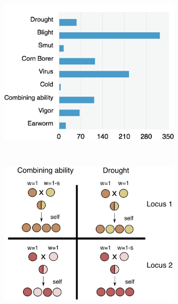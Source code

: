 \documentclass[12pt]{article}
\begin{document}
\begin{figure}[t]
        \begin{subfigure}[b]{0.5\textwidth}
                \includegraphics[width=\textwidth]{disease.png}
                \caption{}
                \label{fig:words}
        \end{subfigure}%
        ~ %
        \begin{subfigure}[b]{0.5\textwidth}
                \includegraphics[width=\textwidth]{divergent.png}
                \caption{}

\end{subfigure}
\end{figure}
\end{document}
